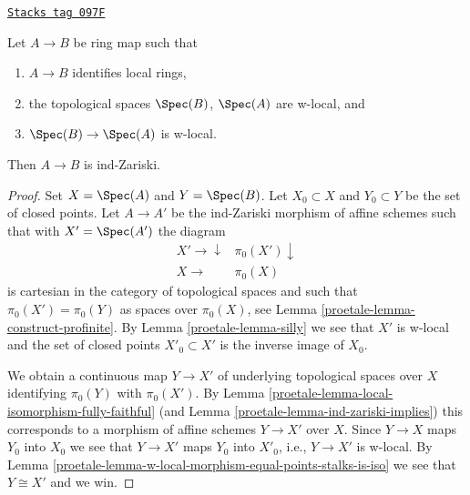 \begin{lemma}
\label{proetale-lemma-w-local-morphism-equal-stalks-is-ind-zariski}
\href{https://stacks.math.columbia.edu/tag/097F}{\texttt{Stacks tag 097F}}

Let $A \to B$ be ring map such that
\begin{enumerate}
\item $A \to B$ identifies local rings,
\item the topological spaces $\Spec(B)$, $\Spec(A)$ are w-local, and
\item $\Spec(B) \to \Spec(A)$ is w-local.
\end{enumerate}
Then $A \to B$ is ind-Zariski.
\end{lemma}

\begin{proof}

Set $X = \Spec(A)$ and $Y = \Spec(B)$. Let $X_0 \subset X$ and
$Y_0 \subset Y$ be the set of closed points. Let $A \to A'$ be the ind-Zariski
morphism of affine schemes such that with $X' = \Spec(A')$ the diagram
$$
\begin{array}{cc}X' \longrightarrow\downarrow & \pi_0(X') \downarrow \\ X \longrightarrow & \pi_0(X)\end{array}
$$
is cartesian in the category of topological spaces and such that
$\pi_0(X') = \pi_0(Y)$ as spaces over $\pi_0(X)$, see
Lemma \ref{proetale-lemma-construct-profinite}. By
Lemma \ref{proetale-lemma-silly} we see that $X'$ is w-local and
the set of closed points $X'_0 \subset X'$ is the inverse image of $X_0$.

\medskip\noindent
We obtain a continuous map $Y \to X'$ of underlying topological spaces
over $X$ identifying $\pi_0(Y)$ with $\pi_0(X')$. By
Lemma \ref{proetale-lemma-local-isomorphism-fully-faithful}
(and Lemma \ref{proetale-lemma-ind-zariski-implies})
this corresponds to a morphism of affine schemes $Y \to X'$
over $X$. Since $Y \to X$ maps $Y_0$ into $X_0$ we see that
$Y \to X'$ maps $Y_0$ into $X'_0$, i.e., $Y \to X'$ is w-local.
By Lemma \ref{proetale-lemma-w-local-morphism-equal-points-stalks-is-iso}
we see that $Y \cong X'$ and we win.
\end{proof}

